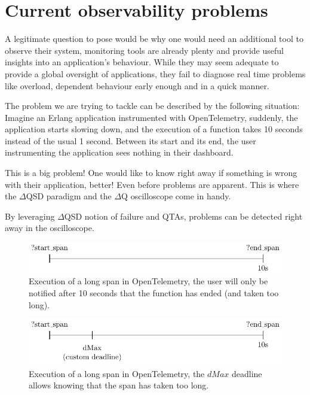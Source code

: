\section{Current observability problems}

    A legitimate question to pose would be why one would need an additional tool to observe their system, monitoring tools are already plenty and provide useful insights into an application's behaviour. While they may seem adequate to provide a global oversight of applications, they fail to diagnose real time problems like overload, dependent behaviour early enough and in a quick manner.

    The problem we are trying to tackle can be described by the following situation: 
    Imagine an Erlang application instrumented with OpenTelemetry, suddenly, the application starts slowing down, and the execution of a function takes 10 seconds instead of the usual 1 second. Between its start and its end, the user instrumenting the application sees nothing in their dashboard.
    
    This is a big problem! One would like to know right away if something is wrong with their application, better! Even before problems are apparent. This is where the $\Delta$QSD paradigm and the $\Delta$Q oscilloscope come in handy.
   
   By leveraging $\Delta$QSD notion of failure and QTAs, problems can be detected right away in the oscilloscope. 
    
    \begin{figure}[H]
        \begin{center}
            \includegraphics{tikz/start_end.pdf}
        \end{center}
        \caption{Execution of a long span in OpenTelemetry, the user will only be notified after 10 seconds that the function has ended (and taken too long).}
    \end{figure}

    \begin{figure}[H]
        \begin{center}
            \includegraphics{tikz/start_end_dmax.pdf}
        \end{center}
        \caption{Execution of a long span in OpenTelemetry, the $dMax$ deadline allows knowing that the span has taken too long.}
        \label{fig:otel_dmax}
    \end{figure} 


